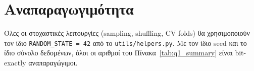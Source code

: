 \documentclass[12pt,a4paper,twoside]{book}
\begin{document}
\section{Αναπαραγωγιμότητα}

Όλες οι στοχαστικές λειτουργίες (sampling, shuffling, CV folds) θα
χρησιμοποιούν τον ίδιο \texttt{RANDOM\_STATE = 42} από το
\texttt{utils/helpers.py}. Με τον ίδιο seed και το ίδιο
σύνολο δεδομένων, όλοι οι αριθμοί του Πίνακα~\ref{tab:q1_summary} είναι
bit-exactly αναπαραγώγιμοι.
\end{document}
